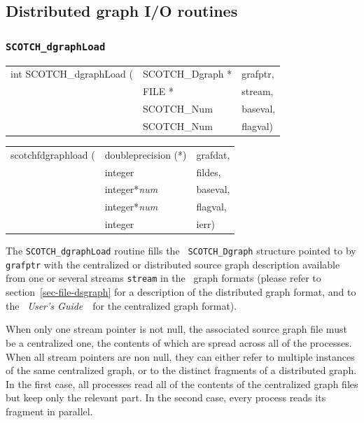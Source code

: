 \subsection{Distributed graph I/O routines}

\subsubsection{{\tt SCOTCH\_dgraphLoad}}
\label{sec-lib-func-dgraphload}

\begin{itemize}
\progsyn

{\tt\begin{tabular}{l@{}ll}
int SCOTCH\_dgraphLoad ( & SCOTCH\_Dgraph * & grafptr, \\
                         & FILE *           & stream, \\
                         & SCOTCH\_Num      & baseval, \\
                         & SCOTCH\_Num      & flagval)
\end{tabular}}

{\tt\begin{tabular}{l@{}ll}
scotchfdgraphload ( & doubleprecision (*) & grafdat, \\
                    & integer             & fildes, \\
                    & integer*{\it num}   & baseval, \\
                    & integer*{\it num}   & flagval, \\
                    & integer             & ierr)
\end{tabular}}

\progdes

The {\tt SCOTCH\_dgraphLoad} routine fills the {\tt
SCOTCH\_\lbt Dgraph} structure pointed to by {\tt grafptr} with the
centralized or distributed source graph description available from
one or several streams {\tt stream} in the \scotch\ graph formats
(please refer to section~\ref{sec-file-dsgraph} for a description
of the distributed graph format, and to the {\it\scotch\ User's
Guide}~\scotchcitesuser\ for the centralized graph format).

When only one stream pointer is not null, the associated source graph
file must be a centralized one, the contents of which are spread
across all of the processes. When all stream pointers are non null,
they can either refer to multiple instances of the same centralized
graph, or to the distinct fragments of a distributed graph. In the
first case, all processes read all of the contents of the centralized
graph files but keep only the relevant part. In the second case, every
process reads its fragment in parallel.


\end{itemize}
